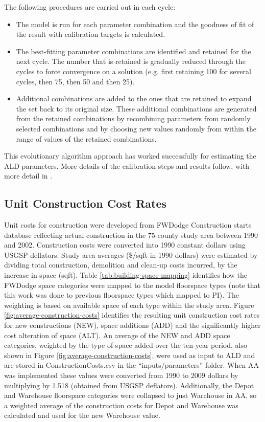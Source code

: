 \noindent The following procedures are carried out in each cycle:
\begin{itemize}
\item The model is run for each parameter combination and the goodness of fit of the result with calibration targets is calculated.
\item The best-fitting parameter combinations are identified and retained for the next cycle. The number that is retained is gradually reduced through the cycles to force convergence on a solution (e.g. first retaining 100 for several cycles, then 75, then 50 and then 25).
\item Additional combinations are added to the ones that are retained to expand the set back to its original size. These additional combinations are generated from the retained combinations by recombining parameters from randomly selected combinations and by choosing new values randomly from within the range of values of the retained combinations.
\end{itemize}

\noindent This evolutionary algorithm approach has worked successfully for estimating the ALD parameters. More details of the calibration steps and results follow, with more detail in \cite{weidner07}. %

\subsection{Unit Construction Cost Rates}\label{sec:ald-unit-cost-rates}  %
Unit costs for construction were developed from FWDodge Construction starts database reflecting actual construction in the 75-county study area between 1990 and 2002. Construction costs were converted into 1990 constant dollars using USGSP deflators. Study area averages (\$/sqft in 1990 dollars) were estimated by dividing total construction, demolition and clean-up costs incurred, by the increase in space (sqft). Table \ref{tab:building-space-mapping} identifies how the FWDodge space categories were mapped to the model floorspace types (note that this work was done to previous floorspace types which mapped to PI). The weighting is based on available space of each type within the study area. Figure \ref{fig:average-construction-costs} identifies the resulting unit construction cost rates for new constructions (NEW), space additions (ADD) and the significantly higher cost alteration of space (ALT). An average of the NEW and ADD space categories, weighted by the type of space added over the ten-year period, also shown in Figure \ref{fig:average-construction-costs}, were used as input to ALD and are stored in ConstructionCosts.csv in the ``inputs/parameters'' folder. When AA was implemented these values were converted from 1990 to 2009 dollars by multiplying by 1.518 (obtained from USGSP deflators). Additionally, the Depot and Warehouse floorspace categories were collapsed to just Warehouse in AA, so a weighted average of the construction costs for Depot and Warehouse was calculated and used for the new Warehouse value.
  
